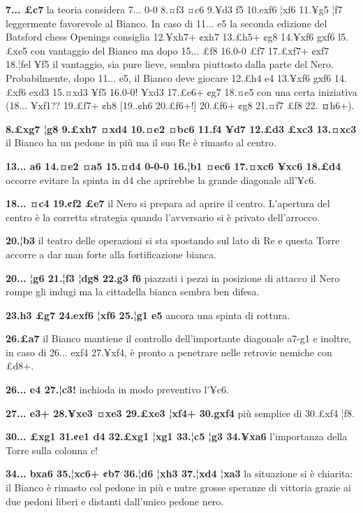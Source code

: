 \textbf{7... £c7} la teoria considera 7... 0-0 8.¤f3 ¤c6 9.¥d3 f5
10.exf6 ¦xf6 11.¥g5 ¦f7 leggermente favorevole al Bianco. In caso di
11... e5 la seconda edizione del Batsford chess Openings consiglia
12.¥xh7+ ¢xh7 13.£h5+ ¢g8 14.¥xf6 gxf6 l5.£xe5 con vantaggio del Bianco
ma dopo 15... £f8 16.0-0 £f7 17.£xf7+ ¢xf7 18.¦fel ¥f5 il vantaggio, sia
pure lieve, sembra piuttosto dalla parte del Nero. Probabilmente, dopo
11... e5, il Bianco deve giocare 12.£h4 e4 13.¥xf6 gxf6 14.£xf6 exd3
15.¤xd3 ¥f5 16.0-0! ¥xd3 17.£e6+ ¢g7 18.¤e5 con una certa iniziativa
(18... ¥xf1?? 19.£f7+ ¢h8 {[}19..¢h6 20.£f6+!{]} 20.£f6+ ¢g8 21.¤f7 £f8
22. \textbf{¤}h6+).

\textbf{8.£xg7 ¦g8 9.£xh7 ¤xd4 10.¤e2 ¤bc6 11.f4 ¥d7 12.£d3 £xc3
13.¤xc3} il Bianco ha un pedone in più ma il suo Re è rimasto al centro.

\textbf{13... a6 14.¤e2 ¤a5 15.¤d4 0-0-0 16.¦b1 ¤ec6 17.¤xc6 ¥xc6
18.£d4} occorre evitare la spinta in d4 che aprirebbe la grande
diagonale all'¥c6.

\textbf{18... ¤c4 19.¢f2 £e7} il Nero si prepara ad aprire il centro.
L'apertura del centro è la corretta strategia quando l'avversario si è
privato dell'arrocco.

\textbf{20.¦b3} il teatro delle operazioni si sta spostando sul lato di
Re e questa Torre accorre a dar man forte alla fortificazione bianca.

\textbf{20... ¦g6 21.¦f3 ¦dg8 22.g3 f6} piazzati i pezzi in posizione di
attacco il Nero rompe gli indugi ma la cittadella bianca sembra ben
difesa.

\textbf{23.h3 £g7 24.exf6 ¦xf6 25.¦g1 e5} ancora una spinta di rottura.

\textbf{26.£a7} il Bianco mantiene il controllo dell'importante
diagonale a7-g1 e inoltre, in caso di 26... exf4 27.¥xf4, è pronto a
penetrare nelle retrovie nemiche con £d8+.

\textbf{26... e4 27.¦c3!} inchioda in modo preventivo l'¥c6.

\textbf{27... e3+ 28.¥xe3 ¤xe3 29.£xe3 ¦xf4+ 30.gxf4} più semplice di
30.£xf4 ¦f8.

\textbf{30... £xg1 31.¢e1 d4 32.£xg1 ¦xg1 33.¦c5 ¦g3 34.¥xa6}
l'importanza della Torre sulla colonna c!

\textbf{34... bxa6 35.¦xc6+ ¢b7 36.¦d6 ¦xh3 37.¦xd4 ¦xa3} la situazione
si è chiarita: il Bianco è rimasto col pedone in più e nutre grosse
speranze di vittoria grazie ai due pedoni liberi e distanti dall'unico
pedone nero.

